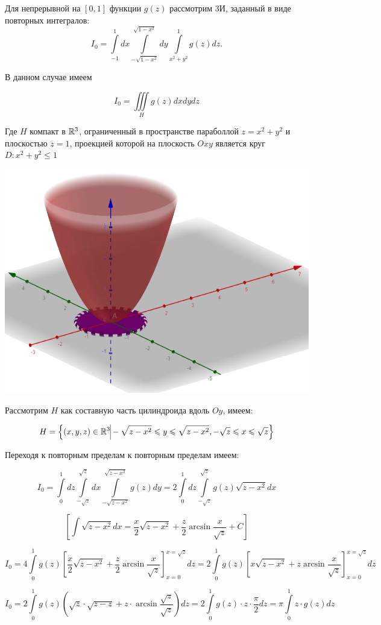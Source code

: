 \documentclass[../../main.tex]{subfiles}
\begin{document}
	\begin{example}
		Для непрерывной на $\left[0, 1\right]$ функции $g\left(z \right)$ рассмотрим 3И, заданный в виде повторных интегралов:
			\[I_0 = \int\limits_{-1}^1dx\int\limits_{-\sqrt{1 - x^2}}^{\sqrt{1 - x^2}}dy\int\limits_{x^2 + y^2}^1 g\left(z\right)dz.\]
		
		В данном случае имеем
		
		\[I_0 = \iiint\limits_{H} g(z) dxdydz\]
		
		Где $H$ компакт в $\mathbb{R}^3$, ограниченный в пространстве параболлой $z = x^2 + y^2$ и плоскостью $z = 1$, проекцией которой на плоскость $Oxy$ является круг $D: x^2 + y^2 \leq 1$
		
		\begin{center}
		\includegraphics[scale = 0.7]{lec14.jpg}
		\end{center}
		
		Рассмотрим $H$ как составную часть цилиндроида вдоль $Oy$, имеем:
		
		\[H = \left\{\left(x, y, z\right) \in \R^3 \vline -\sqrt{z - x^2} \leq y \leq \sqrt{z - x^2}, -\sqrt{z} \leq x \leq \sqrt{z} \right\}\]
		
		Переходя к повторным пределам к повторным пределам имеем:
		
		\[I_0 = \int\limits_0^1dz\int\limits_{-\sqrt{z}}^{\sqrt{z}}dx\int\limits_{-\sqrt{z - x^2}}^{\sqrt{z - x^2}}g\left(z\right)dy = 2\int\limits_0^1dz\int\limits_{-\sqrt{z}}^{\sqrt{z}}g\left(z\right)\sqrt{z - x^2}dx \]
		
		\[\left[\int\sqrt{z - x^2}dx = \frac{x}{2}\sqrt{z - x^2} + \frac{z}{2}\arcsin{\frac{x}{\sqrt{z}}} + C\right]\]
		
		\[I_0 = 4 \int\limits_0^1 g\left(z\right) \left[ \frac{x}{2}\sqrt{z - x^2} + \frac{z}{2}\arcsin{\frac{x}{\sqrt{z}}}\right]_{x=0}^{x=\sqrt{z}}dz= 2 \int\limits_0^1 g\left(z\right) \left[x\sqrt{z - x^2} + z\arcsin{\frac{x}{\sqrt{z}}}\right]_{x=0}^{x=\sqrt{z}}dz\]
		
		\[I_0 = 2 \int\limits_0^1 g\left(z\right) \left(\sqrt{z} \cdot \sqrt{z-z} + z \cdot \arcsin{\frac{\sqrt{z}}{\sqrt{z}}}\right) dz = 2 \int\limits_0^1 g\left(z\right) \cdot z \cdot \frac{\pi}{2} dz = \pi \int\limits_0^1 z \cdot g\left(z\right)dz\]  
		
	\end{example}
\end{document}

